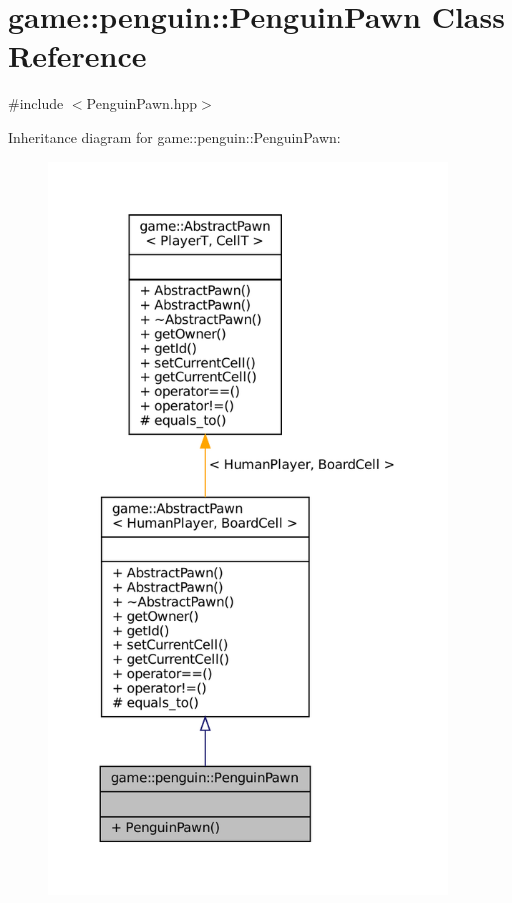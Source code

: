 \hypertarget{classgame_1_1penguin_1_1_penguin_pawn}{}\section{game\+:\+:penguin\+:\+:Penguin\+Pawn Class Reference}
\label{classgame_1_1penguin_1_1_penguin_pawn}


{\ttfamily \#include $<$Penguin\+Pawn.\+hpp$>$}



Inheritance diagram for game\+:\+:penguin\+:\+:Penguin\+Pawn\+:
\nopagebreak
\begin{figure}[H]
\begin{center}
\leavevmode
\includegraphics[height=550pt]{classgame_1_1penguin_1_1_penguin_pawn__inherit__graph}
\end{center}
\end{figure}


